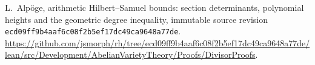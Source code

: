 L.~Alp\"oge, arithmetic Hilbert--Samuel bounds:
section determinants, polynomial heights and the geometric degree inequality,
immutable source revision
\texttt{ecd09ff9b4aaf6c08f2b5ef17dc49ca9648a77de}.
\url{https://github.com/jsmorph/rh/tree/ecd09ff9b4aaf6c08f2b5ef17dc49ca9648a77de/lean/src/Development/AbelianVarietyTheory/Proofs/DivisorProofs}.
